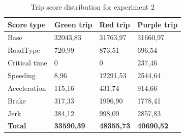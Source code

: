 \begin{table}
    \centering
    \begin{tabular}{llll}
    \textbf{Score type} & \textbf{Green trip} & \textbf{Red trip} & \textbf{Purple trip}\\ \hline
    Base                & 32043,83            & 31763,97          & 31660,97            \\
    RoadType            & 720,99              & 873,51            & 696,54              \\
    Critical time       & 0                   & 0                 & 237,46              \\
    Speeding            & 8,96                & 12291,53          & 2544,64             \\
    Acceleration        & 115,16              & 431,74            & 914,66              \\
    Brake               & 317,33              & 1996,90           & 1778,41             \\
    Jerk                & 384,12              & 998,09            & 2857,83             \\ \hline
    \textbf{Total}      & \textbf{33590,39}   & \textbf{48355,73} & \textbf{40690,52}   \\ \hline
    \end{tabular}
    \caption{Trip score distribution for experiment 2}
    \label{tab:longtripscores}
\end{table}

